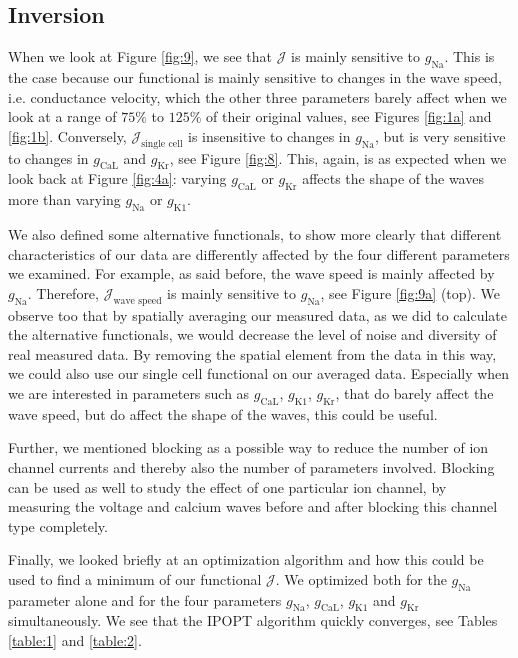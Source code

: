 \documentclass{article}
\begin{document}
\subsection{Inversion} \label{Inversion 2}
%
When we look at Figure \ref{fig:9}, we see that $\mathcal{J}$ is mainly sensitive to $g_{\mathrm{Na}}$. This is the case because our functional is mainly sensitive to changes in the wave speed, i.e. conductance velocity, which the other three parameters barely affect when we look at a range of $75\%$ to $125 \%$ of their original values, see Figures \ref{fig:1a} and \ref{fig:1b}. Conversely, $\mathcal{J}_{\text{single cell}}$ is insensitive to changes in $g_{\mathrm{Na}}$, but is very sensitive to changes in $g_{\mathrm{CaL}}$ and $g_{\mathrm{Kr}}$, see Figure \ref{fig:8}. This, again, is as expected when we look back at Figure \ref{fig:4a}: varying $g_{\mathrm{CaL}}$ or $g_{\mathrm{Kr}}$ affects the shape of the waves more than varying $g_{\mathrm{Na}}$ or $g_{\mathrm{K1}}$. 

We also defined some alternative functionals, to show more clearly that different characteristics of our data are differently affected by the four different parameters we examined. For example, as said before, the wave speed is mainly affected by $g_{\mathrm{Na}}$. Therefore, $\mathcal{J}_{\text{wave speed}}$ is mainly sensitive to $g_{\mathrm{Na}}$, see Figure \ref{fig:9a} (top). We observe too that by spatially averaging our measured data, as we did to calculate the alternative functionals, we would decrease the level of noise and diversity of real measured data. By removing the spatial element from the data in this way, we could also use our single cell functional on our averaged data. Especially when we are interested in parameters such as $g_{\mathrm{CaL}}$, $g_{\mathrm{K1}}$, $g_{\mathrm{Kr}}$, that do barely affect the wave speed, but do affect the shape of the waves, this could be useful. 

Further, we mentioned blocking as a possible way to reduce the number of ion channel currents and thereby also the number of parameters involved. Blocking can be used as well to study the effect of one particular ion channel, by measuring the voltage and calcium waves before and after blocking this channel type completely.

Finally, we looked briefly at an optimization algorithm and how this could be used to find a minimum of our functional $\mathcal{J}$. We optimized both for the $g_{\mathrm{Na}}$ parameter alone and for the four parameters $g_{\mathrm{Na}}$, $g_{\mathrm{CaL}}$, $g_{\mathrm{K1}}$ and $g_{\mathrm{Kr}}$ simultaneously. We see that the IPOPT algorithm quickly converges, see Tables \ref{table:1} and \ref{table:2}. 
\end{document}
